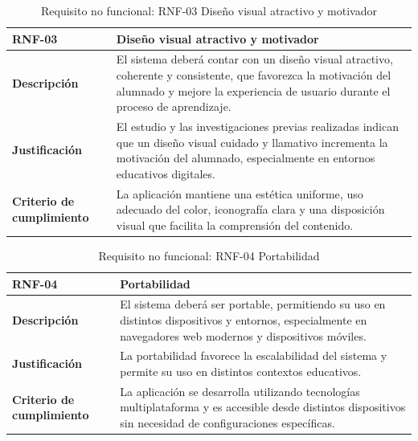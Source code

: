 \begin{table}[H]
\centering
\begin{tabularx}{\textwidth}{
  |>{\centering\arraybackslash}l
  |>{\centering\arraybackslash}X|}
\hline
\textbf{RNF-03} & \textbf{Diseño visual atractivo y motivador} \\ \hline
\textbf{Descripción} & El sistema deberá contar con un diseño visual atractivo, coherente y consistente, que favorezca la motivación del alumnado y mejore la experiencia de usuario durante el proceso de aprendizaje. \\ \hline
\textbf{Justificación} & El estudio y las investigaciones previas realizadas indican que un diseño visual cuidado y llamativo incrementa la motivación del alumnado, especialmente en entornos educativos digitales. \\ \hline
\textbf{Criterio de cumplimiento} & La aplicación mantiene una estética uniforme, uso adecuado del color, iconografía clara y una disposición visual que facilita la comprensión del contenido. \\ \hline
\end{tabularx}
\caption{Requisito no funcional: RNF-03 Diseño visual atractivo y motivador}
\end{table}

\begin{table}[H]
\centering
\begin{tabularx}{\textwidth}{
  |>{\centering\arraybackslash}l
  |>{\centering\arraybackslash}X|}
\hline
\textbf{RNF-04} & \textbf{Portabilidad} \\ \hline
\textbf{Descripción} & El sistema deberá ser portable, permitiendo su uso en distintos dispositivos y entornos, especialmente en navegadores web modernos y dispositivos móviles. \\ \hline
\textbf{Justificación} & La portabilidad favorece la escalabilidad del sistema y permite su uso en distintos contextos educativos. \\ \hline
\textbf{Criterio de cumplimiento} & La aplicación se desarrolla utilizando tecnologías multiplataforma y es accesible desde distintos dispositivos sin necesidad de configuraciones específicas. \\ \hline
\end{tabularx}
\caption{Requisito no funcional: RNF-04 Portabilidad}
\end{table}

